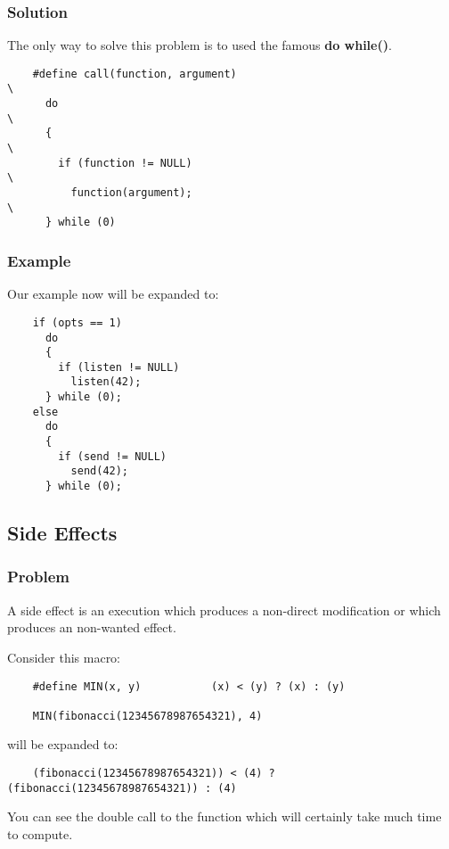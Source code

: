 \documentclass[8pt]{beamer}
\newcommand{\nl}[0]{\vspace{0.4cm}}
\begin{document}

\begin{frame}[containsverbatim]
  \frametitle{Solution}

  The only way to solve this problem is to used the famous
  \textbf{do while()}.

  \begin{verbatim}
    #define call(function, argument)                                    \
      do                                                                \
      {                                                                 \
        if (function != NULL)                                           \
          function(argument);                                           \
      } while (0)
  \end{verbatim}
\end{frame}


\begin{frame}[containsverbatim]
  \frametitle{Example}

  Our example now will be expanded to:

  \begin{verbatim}
    if (opts == 1)
      do
      {
        if (listen != NULL)
          listen(42);
      } while (0);
    else
      do
      {
        if (send != NULL)
          send(42);
      } while (0);
  \end{verbatim}
\end{frame}

%
%

\subsection{Side Effects}


\begin{frame}[containsverbatim]
  \frametitle{Problem}

  A side effect is an execution which produces a non-direct modification
  or which produces an non-wanted effect.

  \nl

  Consider this macro:

  \begin{verbatim}
    #define MIN(x, y)           (x) < (y) ? (x) : (y)

    MIN(fibonacci(12345678987654321), 4)
  \end{verbatim}

  will be expanded to:

  \begin{verbatim}
    (fibonacci(12345678987654321)) < (4) ? (fibonacci(12345678987654321)) : (4)
  \end{verbatim}

  You can see the double call to the function which will certainly take
  much time to compute.
\end{frame}
\end{document}
